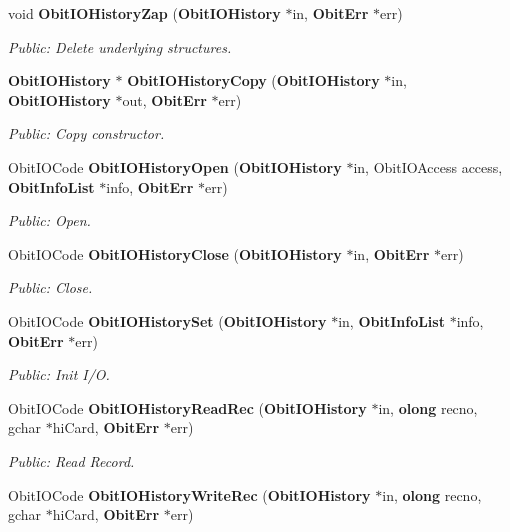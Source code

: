 \begin{CompactItemize}
void {\bf Obit\-IOHistory\-Zap} ({\bf Obit\-IOHistory} $\ast$in, {\bf Obit\-Err} $\ast$err)
\begin{CompactList}\small\item\em Public: Delete underlying structures. \item\end{CompactList}\item 
{\bf Obit\-IOHistory} $\ast$ {\bf Obit\-IOHistory\-Copy} ({\bf Obit\-IOHistory} $\ast$in, {\bf Obit\-IOHistory} $\ast$out, {\bf Obit\-Err} $\ast$err)
\begin{CompactList}\small\item\em Public: Copy constructor. \item\end{CompactList}\item 
Obit\-IOCode {\bf Obit\-IOHistory\-Open} ({\bf Obit\-IOHistory} $\ast$in, Obit\-IOAccess access, {\bf Obit\-Info\-List} $\ast$info, {\bf Obit\-Err} $\ast$err)
\begin{CompactList}\small\item\em Public: Open. \item\end{CompactList}\item 
Obit\-IOCode {\bf Obit\-IOHistory\-Close} ({\bf Obit\-IOHistory} $\ast$in, {\bf Obit\-Err} $\ast$err)
\begin{CompactList}\small\item\em Public: Close. \item\end{CompactList}\item 
Obit\-IOCode {\bf Obit\-IOHistory\-Set} ({\bf Obit\-IOHistory} $\ast$in, {\bf Obit\-Info\-List} $\ast$info, {\bf Obit\-Err} $\ast$err)
\begin{CompactList}\small\item\em Public: Init I/O. \item\end{CompactList}\item 
Obit\-IOCode {\bf Obit\-IOHistory\-Read\-Rec} ({\bf Obit\-IOHistory} $\ast$in, {\bf olong} recno, gchar $\ast$hi\-Card, {\bf Obit\-Err} $\ast$err)
\begin{CompactList}\small\item\em Public: Read Record. \item\end{CompactList}\item 
Obit\-IOCode {\bf Obit\-IOHistory\-Write\-Rec} ({\bf Obit\-IOHistory} $\ast$in, {\bf olong} recno, gchar $\ast$hi\-Card, {\bf Obit\-Err} $\ast$err)

\end{CompactItemize}
